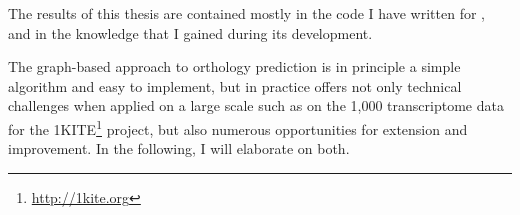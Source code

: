 The results of this thesis are contained mostly in the code I have written for
\pname, and in the knowledge that I gained during its development. 

The graph-based approach to orthology prediction is in principle a simple
algorithm and easy to implement, but in practice offers not only technical
challenges when applied on a large scale such as on the 1,000 transcriptome data
for the 1KITE\footnote{\url{http://1kite.org}} project, but also numerous
opportunities for extension and improvement. In the following, I will elaborate
on both.

